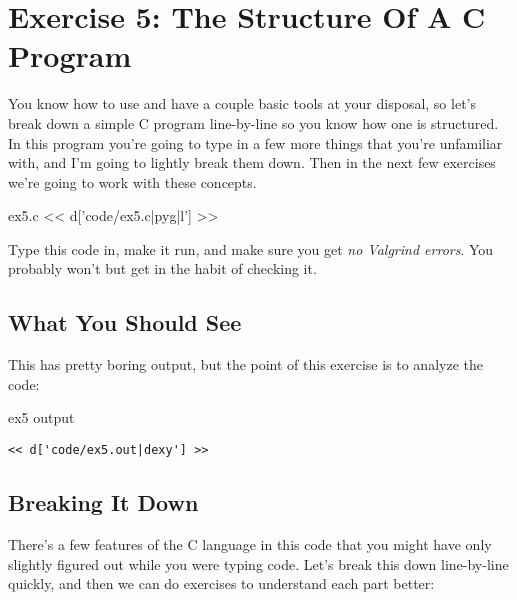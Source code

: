 \chapter{Exercise 5: The Structure Of A C Program}

You know how to use  and have a couple basic tools
at your disposal, so let's break down a simple C program line-by-line
so you know how one is structured.  In this program you're going to
type in a few more things that you're unfamiliar with, and I'm going
to lightly break them down.  Then in the next few exercises we're 
going to work with these concepts.

\begin{code}{ex5.c}
<< d['code/ex5.c|pyg|l'] >>
\end{code}

Type this code in, make it run, and make sure you get \emph{no Valgrind
errors}.  You probably won't but get in the habit of checking it. 

\section{What You Should See}

This has pretty boring output, but the point of this exercise is
to analyze the code:

\begin{code}{ex5 output}
\begin{lstlisting}
<< d['code/ex5.out|dexy'] >>
\end{lstlisting}
\end{code}


\section{Breaking It Down}

There's a few features of the C language in this code that you 
might have only slightly figured out while you were typing code.
Let's break this down line-by-line quickly, and then we can do
exercises to understand each part better:

